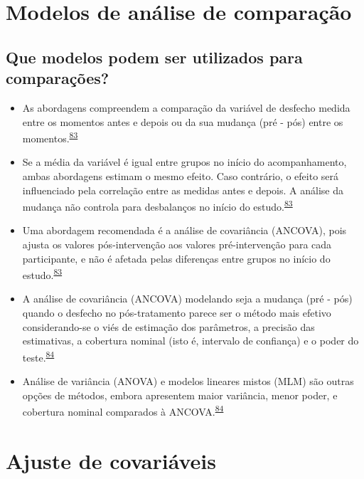 \documentclass[
]{book}
\begin{document}
\hypertarget{metodos-comparacao}{%
\section{Modelos de análise de comparação}\label{metodos-comparacao}}

\hypertarget{que-modelos-podem-ser-utilizados-para-comparauxe7uxf5es}{%
\subsection{Que modelos podem ser utilizados para comparações?}\label{que-modelos-podem-ser-utilizados-para-comparauxe7uxf5es}}

\begin{itemize}
\item
  As abordagens compreendem a comparação da variável de desfecho medida entre os momentos antes e depois ou da sua mudança (pré - pós) entre os momentos.\textsuperscript{\protect\hyperlink{ref-Vickers2001}{83}}
\item
  Se a média da variável é igual entre grupos no início do acompanhamento, ambas abordagens estimam o mesmo efeito. Caso contrário, o efeito será influenciado pela correlação entre as medidas antes e depois. A análise da mudança não controla para desbalanços no início do estudo.\textsuperscript{\protect\hyperlink{ref-Vickers2001}{83}}
\item
  Uma abordagem recomendada é a análise de covariância (ANCOVA), pois ajusta os valores pós-intervenção aos valores pré-intervenção para cada participante, e não é afetada pelas diferenças entre grupos no início do estudo.\textsuperscript{\protect\hyperlink{ref-Vickers2001}{83}}
\item
  A análise de covariância (ANCOVA) modelando seja a mudança (pré - pós) quando o desfecho no pós-tratamento parece ser o método mais efetivo considerando-se o viés de estimação dos parâmetros, a precisão das estimativas, a cobertura nominal (isto é, intervalo de confiança) e o poder do teste.\textsuperscript{\protect\hyperlink{ref-OConnell2017}{84}}
\item
  Análise de variância (ANOVA) e modelos lineares mistos (MLM) são outras opções de métodos, embora apresentem maior variância, menor poder, e cobertura nominal comparados à ANCOVA.\textsuperscript{\protect\hyperlink{ref-OConnell2017}{84}}
\end{itemize}

\hypertarget{ajuste-de-covariaveis}{%
\section{Ajuste de covariáveis}\label{ajuste-de-covariaveis}}
\end{document}

